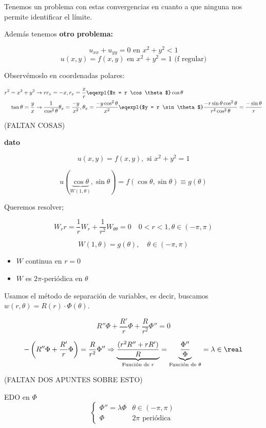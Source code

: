 		Tenemos un problema con estas convergencias en cuanto a que ninguna nos permite identificar el límite.

		Además tenemos \textbf{otro problema:}

		\[u_{xx} + u_{yy} = 0 \text{ en } x^2 + y^2 < 1 \]
		\[u(x,y) = f(x,y) \text{ en } x^2 + y^2 = 1 \text{  (f regular)}\]

		Observémoslo en coordenadas polares:

		\begin{align*}
		 r^2 = x^2 + y^2  &\rightarrow rr_x = -x , r_x = \frac{x}{r} \eqexpl{$x = r \cos \theta $} \cos \theta \\
		 \tan \theta = \frac{y}{x} &\rightarrow \frac{1}{\cos^2 \theta} \theta_x = \frac{-y}{x^2}, \theta_x = \frac{-y \cos^2\theta}{x^2} \eqexpl{$y = r \sin \theta$} \frac{-r \sin \theta \cos^2 \theta}{r^2 \cos^2 \theta} = \frac{- \sin \theta}{r}
		\end{align*}

		(FALTAN COSAS)


		\textbf{dato}

		\[ u(x,y) = f(x,y), \text{ si } x^2 + y^2 = 1\]

		\[ u(\underbrace{\cos \theta}_{W(1,\theta)}, \sin \theta) = f(\cos \theta, \sin \theta) \equiv g(\theta)\]

		Queremos resolver;

		\[ W_rr = \frac{1}{r} W_r + \frac{1}{r^2} W_{\theta \theta} = 0 \quad 0 < r < 1, \theta \in (-\pi, \pi)\]

		\[W(1, \theta) = g(\theta), \quad \theta \in (-\pi,\pi) \]

		\begin{itemize}
			\item $W$ continua en $r=0$
			\item $W$ es $2\pi$-periódica en $\theta$
		\end{itemize}

		Usamos el método de separación de variables, es decir, buscamos $w(r, \theta) = R(r)\cdot \Phi(\theta)$.

		\[R''\Phi + \frac{R'}{r}\Phi + \frac{R}{r^2} \Phi'' = 0 \]

		\[ - \left( R'' \Phi + \frac{R'}{r}\Phi \right) = \frac{R}{r^2} \Phi'' \Rightarrow \underbrace{\frac{(r^2R''+rR')}{R}}_{\text{Función de }r} = \underbrace{\frac{\Phi''}{\Phi}}_{\text{Función de }\theta} = \lambda \in \real \]

		(FALTAN DOS APUNTES SOBRE ESTO)


		EDO en $\Phi$
		\[
		\begin{cases}
			\Phi'' = \lambda \Phi & \theta \in (-\pi, \pi) \\
			\Phi & 2\pi \text{ periódica }
		\end{cases}\]


